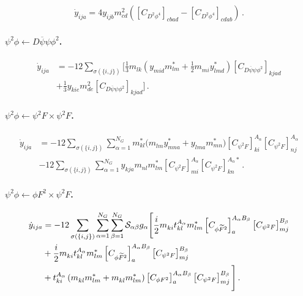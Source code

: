 \begin{align}
    \dot y_{ija} = 4 y_{ijb} m^2_{cd} \left(\left[C_{D^2\phi^4}\right]_{cbad} - \left[C_{D^2\phi^4}\right]_{cdab} \right) \,.
\end{align}

\paragraph{\texorpdfstring{$\psi^2 \phi \leftarrow D\overline\psi\psi\phi^2$}{yukfromDpsibarpsiphi2}.}

\begin{align}
    \dot y_{ija} &= -12\sum_{\sigma(\{i,j\})}  \Bigg[\frac{1}{3} m_{lk}^{\phantom *} \left( y_{mid}^{\phantom *} m_{lm}^* +\frac{1}{2}m_{mi}^{\phantom *} y_{lmd}^* \right)  \left[C_{D\overline\psi\psi\phi^2}\right]_{kjad}
    \nonumber\\& 
    +\frac{1}{3} y_{kie} m^2_{de} \left[C_{D\overline\psi\psi\phi^2}\right]_{kjad}\Bigg]\label{yuk_Dbarpsipsiphi2}\,.
\end{align}

\paragraph{$\psi^2\phi \leftarrow \psi^2 F \times \psi^2 F$.}

\begin{align}
    \dot y_{ija} &= -12\sum_{\sigma(\{i,j\})} \sum_{\alpha=1}^{N_G} m_{kl}^{*} \Big(m_{lm}^{\phantom *} y^*_{mna}+y_{lma}^{\phantom *} m^*_{mn}\Big) \left[C_{\psi^2 F}\right]_{ki}^{A_\alpha}\left[C_{\psi^2 F}\right]_{nj}^{A_\alpha} \nonumber \\
    &-12 \sum_{\sigma(\{i,j\})} \sum_{\alpha=1}^{N_G} y_{kja} m_{nl}m^*_{lm}\left[C_{\psi^2 F}\right]^{A_\alpha}_{mi}\left[C_{\psi^2 F}\right]^{A_\alpha *}_{kn} \,. 
\end{align}

\paragraph{$\psi^2\phi \leftarrow \phi F^2 \times \psi^2 F$.}

\begin{align}
    \dot y_{ija} &= -12\sum_{\sigma(\{i,j\})} \sum_{\alpha=1}^{N_G}\sum_{\beta=1}^{N_G} \mathcal{S}_{\alpha\beta} g_\alpha\Bigg[\frac{i}{2} m_{ki}^{\phantom *} t_{kl}^{A_\alpha} m_{lm}^* \left[C_{\phi \tildee F^2}\right]_{a}^{A_\alpha B_\beta}\left[C_{\psi^2 F}\right]_{mj}^{B_\beta}\nonumber\\
    &+ \frac{i}{2} m_{ki}^{\phantom *} t_{kl}^{A_\alpha} m_{lm}^* \left[C_{\phi \tildee F^2}\right]_{a}^{A_\alpha B_\beta}\left[C_{\psi^2 F}\right]_{mj}^{B_\beta}\nonumber\\
    &+ t_{ki}^{A_\alpha} \left(m_{kl}^{\phantom *} m_{lm}^* +m_{kl}^{\phantom *} m_{lm}^* \right)\left[C_{\phi F^2}\right]_{a}^{A_\alpha B_\beta}\left[C_{\psi^2 F}\right]_{mj}^{B_\beta}\Bigg]\,.
\end{align}


